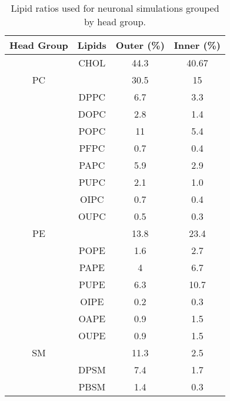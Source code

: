 \documentclass[9pt]{article}
\begin{document}
\renewcommand{\thetable}{SI 1}
\begin{table}
    \caption{Lipid ratios used for neuronal simulations grouped by head group.}
    \label{tab:rats}
    \centering

\begin{tabular}{|c||c|cc|}

\hline
Head Group & Lipids & Outer (\%) &{Inner (\%)} \\ \hline\hline
{}&CHOL                         & 44.3     & 40.67                         \\
\hline
PC &{} &30.5&15\\ \hline
{} &DPPC                         & 6.7      & 3.3                           \\
{} &DOPC                         & 2.8      & 1.4                           \\
{} &POPC                         & 11     & 5.4                         \\
{} &PFPC                         & 0.7      & 0.4                           \\
{} &PAPC                         & 5.9      & 2.9                           \\
{} &PUPC                         & 2.1      & 1.0                           \\
{} &OIPC                         & 0.7      & 0.4                           \\
{} &OUPC                         & 0.5      & 0.3                           \\
\hline
\hline
PE &{} &13.8&23.4\\ \hline
{} &POPE                         & 1.6      & 2.7                           \\
{} &PAPE                         & 4      & 6.7                           \\
{} &PUPE                         & 6.3      & 10.7                          \\
{} &OIPE                         & 0.2      & 0.3                           \\
{} &OAPE                         & 0.9      & 1.5                           \\
{} &OUPE                         & 0.9      & 1.5                          \\
\hline
\hline
SM &{} &11.3&2.5\\ \hline
{} &DPSM                         & 7.4      & 1.7                           \\
{} &PBSM                         & 1.4      & 0.3                           \\

\end{tabular}
\end{table}
\end{document}
